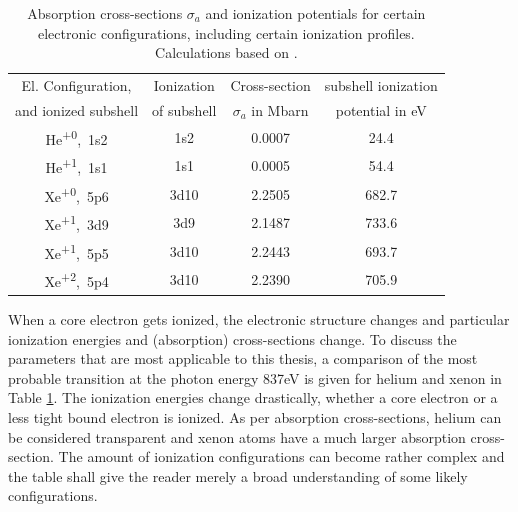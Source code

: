 \begin{table}
	\centering
		\begin{tabular}{ | c | c | c | c | }
		\hline
			El. Configuration, & Ionization & Cross-section  & subshell ionization  \\
			and ionized subshell & of subshell & $\sigma_{a}$ in Mbarn & potential in eV \\ \hline
			He\textsuperscript{+0},\ 1s2 & 1s2 & 0.0007 & 24.4 \\ \hline
			He\textsuperscript{+1},\ 1s1 & 1s1 & 0.0005 & 54.4 \\ \hline
			Xe\textsuperscript{+0},\ 5p6 & 3d10 & 2.2505 & 682.7 \\ \hline
			Xe\textsuperscript{+1},\ 3d9 & 3d9 & 2.1487 & 733.6 \\ \hline
			Xe\textsuperscript{+1},\ 5p5 & 3d10 & 2.2443 & 693.7 \\ \hline
			Xe\textsuperscript{+2},\ 5p4 & 3d10 & 2.2390 & 705.9 \\ \hline
		\end{tabular}
	\caption[Absorption cross-sections and ionization potentials for xenon and helium]{Absorption cross-sections $\sigma_{a}$ and ionization potentials for certain electronic configurations, including certain ionization profiles. Calculations based on \citep{Cowan-1981-Cal}.}
	\label{tab:helium-xenon-ionization}
\end{table}
When a core electron gets ionized, the electronic structure changes and particular ionization energies and (absorption) cross-sections change. To discuss the parameters that are most applicable to this thesis, a comparison of the most probable transition at the photon energy 837eV is given for helium and xenon in Table \ref{tab:helium-xenon-ionization}. The ionization energies change drastically, whether a core electron or a less tight bound electron is ionized. As per absorption cross-sections, helium can be considered transparent and xenon atoms have a much larger absorption cross-section. The amount of ionization configurations can become rather complex and the table shall give the reader merely a broad understanding of some likely configurations.\\
